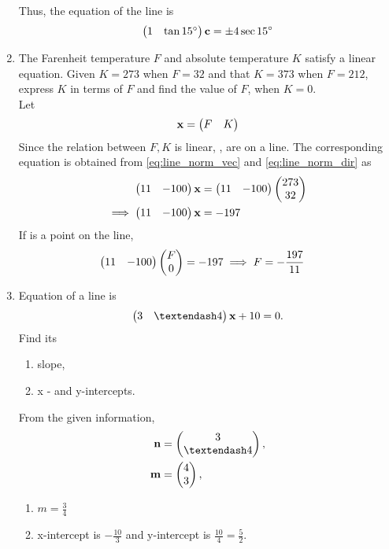\documentclass[journal,12pt,twocolumn]{IEEEtran}
\renewcommand\thesection{\arabic{section}}
\begin{document}
\begin{enumerate}[label=\thesection.\arabic*.,ref=\thesection.\theenumi]
Thus, the equation of the line is 
\begin{align}
\begin{pmatrix}1 &\tan 15\degree\end{pmatrix} \mathbf{c} = \pm 4 \sec 15\degree
\end{align}
\item The Farenheit temperature $F$ and absolute temperature $K$ satisfy a linear equation.  Given $K=273$ when $F=32$ and that $K=373$  when $F=212$, express $K$ in terms of $F$ and find the value of $F$, when $K=0$.
%
\\
\solution Let 
\begin{align}
\mathbf{x}=\begin{pmatrix}F & K\end{pmatrix} 
\end{align}
%
Since the relation between $F, K$ is linear, ,  are on a line.  The corresponding equation is obtained from \eqref{eq:line_norm_vec} and \eqref{eq:line_norm_dir} as 
%
\begin{align}
\begin{pmatrix}11 & -100\end{pmatrix}\mathbf{x} &= \begin{pmatrix}11 & -100\end{pmatrix}\begin{pmatrix}273\\32\end{pmatrix} 
\\
\implies \begin{pmatrix}11 & -100\end{pmatrix}\mathbf{x} &= -197
\end{align}
%
If  is a point on the line, 
%
\begin{align}
\begin{pmatrix}11 & -100\end{pmatrix}\begin{pmatrix}F\\0\end{pmatrix} &= -197
\implies F = -\frac{197}{11}
\end{align}
%
\item Equation of a line is 
\begin{align}
\myvec{3 & – 4}\vec{x} + 10 = 0. 
\end{align}
Find its 
\begin{enumerate}
\item  slope, 
\item  x - and y-intercepts.
\end{enumerate}
%
\solution From the given information, 
%
\begin{align}
\vec{n} &= \myvec{3 \\ – 4}, 
\\
\vec{m} &= \myvec{4 \\ 3}, 
\end{align}
%
\begin{enumerate}
\item $m = \frac{3}{4}$
\item x-intercept is $-\frac{10}{3}$ and y-intercept is $\frac{10}{4} = \frac{5}{2}$.
\end{enumerate}

\end{enumerate}
\end{document}
